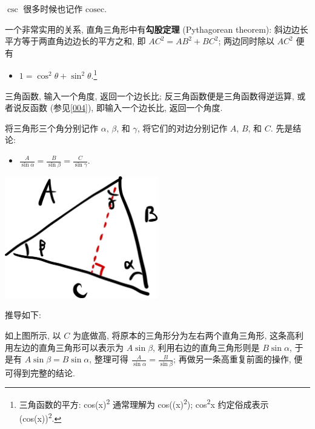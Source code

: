 \begin{tcolorbox}[size=fbox, breakable, enhanced jigsaw, title={三角函数
(trigonometry)}]
$\csc$ 很多时候也记作 $\text{cosec}$.

一个非常实用的关系, 直角三角形中有\textbf{勾股定理} (Pythagorean
theorem): 斜边边长平方等于两直角边边长的平方之和, 即 $AC^2=AB^2+BC^2$;
两边同时除以 $AC^2$ 便有

\begin{itemize}

\item
  $\boxed{1=\cos^2\theta+\sin^2\theta}$.\footnote{三角函数的平方:
    cos(x)\textsuperscript{2} 通常理解为 cos((x)\textsuperscript{2});
    cos\textsuperscript{2}x 约定俗成表示 (cos(x))\textsuperscript{2}.}
\end{itemize}

\end{tcolorbox}

\begin{tcolorbox}[size=fbox, breakable, enhanced jigsaw, title={反三角函数}]

三角函数, 输入一个角度, 返回一个边长比; 反三角函数便是三角函数得逆运算,
或者说反函数 (参见\ref{004}), 即输入一个边长比, 返回一个角度.

\end{tcolorbox}

\begin{tcolorbox}[size=fbox, breakable, enhanced jigsaw, title={正弦定律 (law of sine)}]

将三角形三个角分别记作 $\alpha$, $\beta$, 和 $\gamma$,
将它们的对边分别记作 $A$, $B$, 和 $C$. 先是结论:

\begin{itemize}

\item
  $\boxed{\frac{A}{\sin\alpha}=\frac{B}{\sin\beta}=\frac{C}{\sin\gamma}}$.
\end{itemize}

\begin{tcolorbox}[size=fbox, breakable, enhanced jigsaw]
\includegraphics[width=0.5\textwidth]{img/image-20230308142913522.png}
\end{tcolorbox}

推导如下:

如上图所示, 以 $C$ 为底做高, 将原本的三角形分为左右两个直角三角形,
这条高利用左边的直角三角形可以表示为 $A\sin\beta$,
利用右边的直角三角形则是 $B\sin\alpha$, 于是有
$A\sin\beta=B\sin\alpha$, 整理可得
$\frac{A}{\sin\alpha}=\frac{B}{\sin\beta}$;
再做另一条高重复前面的操作, 便可得到完整的结论.

\end{tcolorbox}

